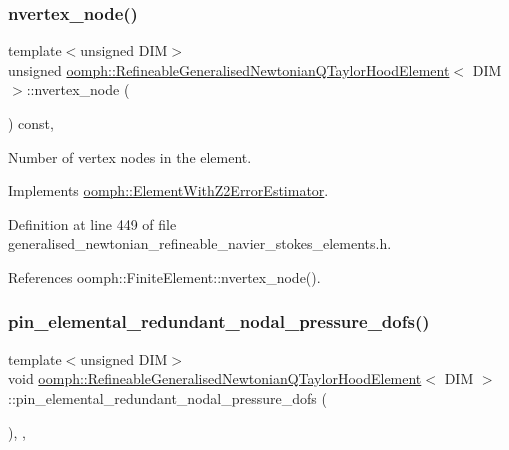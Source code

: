 \subsubsection{\texorpdfstring{nvertex\+\_\+node()}{nvertex\_node()}}
{\footnotesize\ttfamily template$<$unsigned D\+IM$>$ \\
unsigned \hyperlink{classoomph_1_1RefineableGeneralisedNewtonianQTaylorHoodElement}{oomph\+::\+Refineable\+Generalised\+Newtonian\+Q\+Taylor\+Hood\+Element}$<$ D\+IM $>$\+::nvertex\+\_\+node (\begin{DoxyParamCaption}{ }\end{DoxyParamCaption}) const\hspace{0.3cm}{\ttfamily [inline]}, {\ttfamily [virtual]}}



Number of vertex nodes in the element. 



Implements \hyperlink{classoomph_1_1ElementWithZ2ErrorEstimator_a19495a0e77ef4ff35f15fdf7913b4077}{oomph\+::\+Element\+With\+Z2\+Error\+Estimator}.



Definition at line 449 of file generalised\+\_\+newtonian\+\_\+refineable\+\_\+navier\+\_\+stokes\+\_\+elements.\+h.



References oomph\+::\+Finite\+Element\+::nvertex\+\_\+node().

\mbox{\label{classoomph_1_1RefineableGeneralisedNewtonianQTaylorHoodElement_a809f295d07ea41ff6a71cf15ffb82692}} 
\subsubsection{\texorpdfstring{pin\+\_\+elemental\+\_\+redundant\+\_\+nodal\+\_\+pressure\+\_\+dofs()}{pin\_elemental\_redundant\_nodal\_pressure\_dofs()}}
{\footnotesize\ttfamily template$<$unsigned D\+IM$>$ \\
void \hyperlink{classoomph_1_1RefineableGeneralisedNewtonianQTaylorHoodElement}{oomph\+::\+Refineable\+Generalised\+Newtonian\+Q\+Taylor\+Hood\+Element}$<$ D\+IM $>$\+::pin\+\_\+elemental\+\_\+redundant\+\_\+nodal\+\_\+pressure\+\_\+dofs (\begin{DoxyParamCaption}{ }\end{DoxyParamCaption})\hspace{0.3cm}{\ttfamily [inline]}, {\ttfamily [private]}, {\ttfamily [virtual]}}



